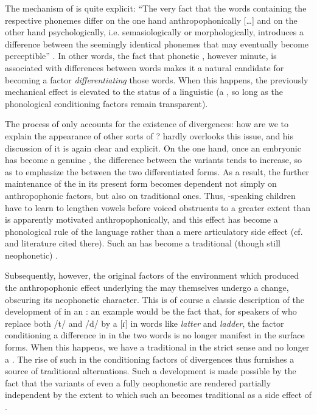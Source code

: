 The {mechanism} of  is quite explicit: ``The very fact
that the words containing the respective phonemes differ on the one
hand anthropophonically {[\ldots]} and on the other hand
psychologically, i.e. semasiologically or morphologically, introduces
a difference between the seemingly identical phonemes that may
eventually become perceptible'' \citep[195]{baudouin95:attempt}. In
other words, the fact that phonetic , however minute, is
associated with differences between words makes it a natural candidate
for becoming a factor \emph{differentiating} those words. When this
happens, the previously mechanical effect is elevated to the status of
a linguistic  (a , so long as the phonological
conditioning factors remain transparent).

The process of  only accounts for the existence of
divergences: how are we to explain the appearance of other sorts of
? {\Baudouin} hardly overlooks this issue, and his discussion
of it is again clear and explicit. On the one hand, once an embryonic
 has become a genuine , the difference between
the variants tends to increase, so as to emphasize the 
between the two differentiated forms. As a result, the further
maintenance of the  in its present form becomes dependent
not simply on anthropophonic factors, but also on traditional
ones. Thus, -speaking children have to learn to lengthen vowels
before voiced obstruents to a greater extent than is apparently
motivated anthropophonically, and this effect has become a
phonological rule of the language rather than a mere articulatory side
effect (cf. \citealt{sra81:unnatural} and literature cited
there). Such an  has become a traditional (though still
neophonetic) .

Subsequently, however, the original factors of the environment which
produced the anthropophonic effect underlying the  may
themselves undergo a change, obscuring its neophonetic character. This
is of course a classic description of the development of  in an
: an example would be the fact that, for speakers of
 who replace both /t/ and /d/ by a  {[ɾ]} in words
like \emph{latter} and \emph{ladder}, the factor conditioning a
difference in  in the two words is no longer manifest in
the surface forms. When this happens, we have a traditional
 in the strict sense and no longer a . The rise
of such  in the conditioning factors of divergences thus
furnishes a source of traditional alternations. Such a development is
made possible by the fact that the variants of even a fully
neophonetic  are rendered partially independent by the
extent to which such an  becomes traditional as a side
effect of .

